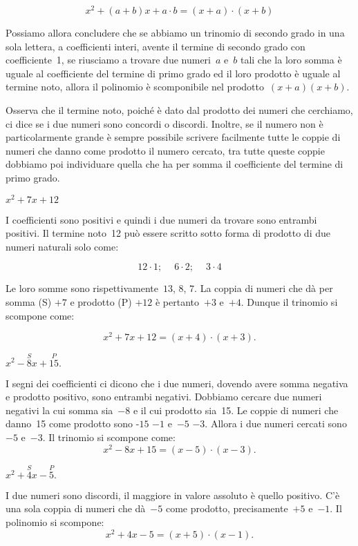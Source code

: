 \[x^{{2}}+\left(a+b\right)x+a\cdot b=\left(x+a\right)\cdot\left(x+b\right)\]

Possiamo allora concludere che se abbiamo un trinomio di secondo grado
in una sola lettera, a coefficienti interi, avente il termine di
secondo grado con coefficiente~1, se riusciamo a trovare due numeri~$a$ e~$b$
tali che la loro somma è uguale al
coefficiente del termine di primo grado ed il loro prodotto è uguale
al termine noto, allora il polinomio è scomponibile nel prodotto~$(x+a)(x+b)$.

Osserva che il termine noto, poiché è dato dal prodotto dei numeri
che cerchiamo, ci dice se i due numeri sono concordi o discordi.
Inoltre, se il numero non è particolarmente grande è sempre
possibile scrivere facilmente tutte le coppie di numeri che danno come
prodotto il numero cercato, tra tutte queste coppie dobbiamo poi
individuare quella che ha per somma il coefficiente del termine di
primo grado.

 \begin{esempio}
 $x^{2}+7x+12$

 I coefficienti sono positivi e quindi i due numeri da trovare sono
entrambi positivi.
Il termine noto~12 può essere scritto sotto forma di prodotto di due
numeri naturali solo come:

\[12\cdot 1;\quad~6\cdot 2;\quad~3\cdot 4\]

Le loro somme sono rispettivamente~$13$, $8$, $7$. La coppia di numeri che
dà per somma (S) $+7$ e prodotto (P) $+12$ è pertanto~$+3$ e~$+4$. Dunque il
trinomio si scompone come:

\[x^{2}+7x+12=\left(x+4\right)\cdot \left(x+3\right).\]
 \end{esempio}

 \begin{esempio}
 $x^{2}-\overset{S}{8}x+\overset{P}{15}.$

I segni dei coefficienti ci dicono che i due numeri, dovendo avere somma
negativa e prodotto positivo, sono entrambi negativi. Dobbiamo cercare
due numeri negativi la cui somma sia~$-8$ e il cui prodotto sia~15. Le
coppie di numeri che danno~15 come prodotto sono -$15$ $-1$ e~$-5$ $-3$.
Allora i due numeri cercati sono~$-5$ e~$-3$. Il trinomio si scompone
come:
\[x^{2}-8x+15=\left(x-5\right)\cdot \left(x-3\right).\]
 \end{esempio}

\begin{esempio}
 $x^{2}+\overset{S}{4}x-\overset{P}{5}.$

I due numeri sono discordi, il maggiore in valore assoluto è quello
positivo. C'è una sola coppia di numeri che dà~$-5$
come prodotto, precisamente~$+5$ e~$-1$. Il polinomio si scompone:
\[x^{2}+4x-5=\left(x+5\right)\cdot \left(x-1\right).\]
\end{esempio}

